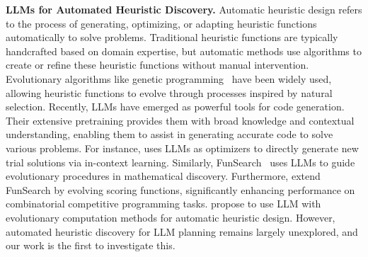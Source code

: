 
\textbf{LLMs for Automated Heuristic Discovery.} 
Automatic heuristic design refers to the process of generating, optimizing, or adapting heuristic functions automatically to solve problems. Traditional heuristic functions are typically handcrafted based on domain expertise, but automatic methods use algorithms to create or refine these heuristic functions without manual intervention. Evolutionary algorithms like genetic programming~\citep{koza1994genetic} have been widely used, allowing heuristic functions to evolve through processes inspired by natural selection. Recently, LLMs have emerged as powerful tools for code generation. Their extensive pretraining provides them with broad knowledge and contextual understanding, enabling them to assist in generating accurate code to solve various problems. For instance, \citet{liu2024large} uses LLMs as optimizers to directly generate new trial solutions via in-context learning. Similarly, FunSearch~\citep{romera2024mathematical} uses LLMs to guide evolutionary procedures in mathematical discovery. Furthermore, \citet{velivckovic2024amplifying} extend FunSearch by evolving scoring functions, significantly enhancing performance on combinatorial competitive programming tasks. \citet{liu2024evolution} propose to use LLM with evolutionary computation methods for automatic heuristic design. However, automated heuristic discovery for LLM planning remains largely unexplored, and our work is the first to investigate this.

